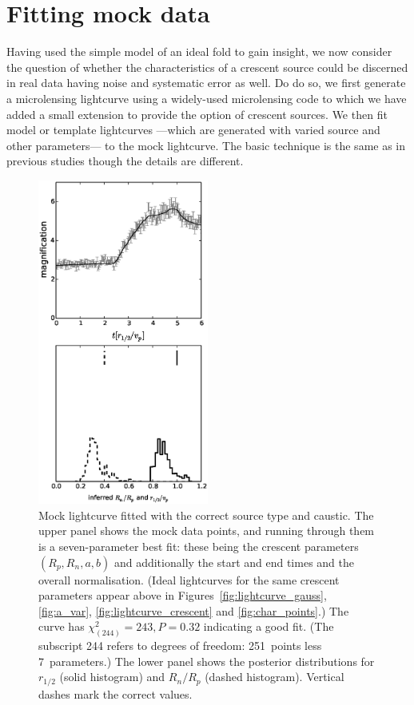 \documentclass[usenatbib]{mn2e}
\begin{document}
\section{Fitting mock data}\label{sec:numerics}

Having used the simple model of an ideal fold to gain insight, we now
consider the question of whether the characteristics of a crescent
source could be discerned in real data having noise and systematic
error as well.  Do do so, we first generate a microlensing lightcurve
using a widely-used microlensing code
\citep{1990PhDT.......180W,1999A&A...346L...5W,1999JCoAM.109..353W} to
which we have added a small extension to provide the option of
crescent sources.  We then fit model or template lightcurves ---which
are generated with varied source and other parameters--- to the mock
lightcurve.  The basic technique is the same as in previous studies
\citep[e.g.,][]{2010ApJ...712..658P} though the details are different.

\begin{figure}
\centering
  \includegraphics[width=0.5\textwidth]{figures/cc_forward.eps}
\caption{\label{fig:cc_forward} Mock lightcurve fitted with the
  correct source type and caustic.  The upper panel shows the mock
  data points, and running through them is a seven-parameter best fit:
  these being the crescent parameters $(R_p,R_n,a,b)$ and additionally
  the start and end times and the overall normalisation.  (Ideal
  lightcurves for the same crescent parameters appear above in
  Figures~\ref{fig:lightcurve_gauss}, \ref{fig:a_var},
  \ref{fig:lightcurve_crescent} and \ref{fig:char_points}.)  The curve
  has $\chi^2_{(244)}=243, P=0.32$ indicating a good fit.  (The
  subscript 244 refers to degrees of freedom: 251~points less
  7~parameters.)  The lower panel shows the posterior distributions
  for $r_{1/2}$ (solid histogram) and $R_n/R_p$ (dashed histogram).
  Vertical dashes mark the correct values.}
\end{figure}
\end{document}
